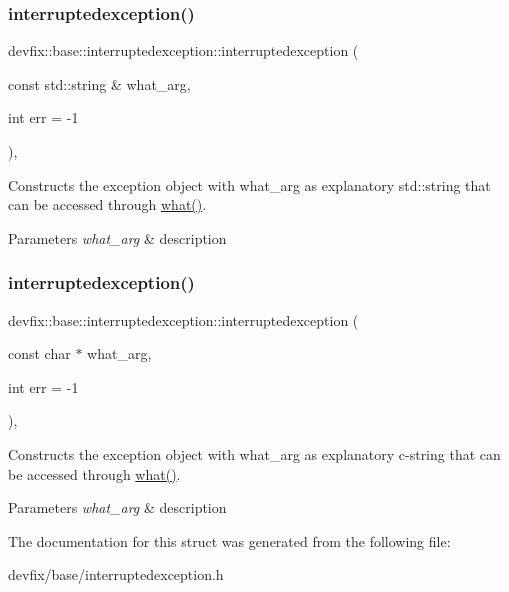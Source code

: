 \subsubsection{\texorpdfstring{interruptedexception()}{interruptedexception()}\hspace{0.1cm}{\footnotesize\ttfamily [1/2]}}
{\footnotesize\ttfamily devfix\+::base\+::interruptedexception\+::interruptedexception (\begin{DoxyParamCaption}\item[{const std\+::string \&}]{what\+\_\+arg,  }\item[{int}]{err = {\ttfamily -\/1} }\end{DoxyParamCaption})\hspace{0.3cm}{\ttfamily [inline]}, {\ttfamily [explicit]}}

Constructs the exception object with what\+\_\+arg as explanatory std\+::string that can be accessed through \hyperlink{structdevfix_1_1base_1_1exception_ad2066a6a81737c0fdf776120a6ca69d2}{what()}. 
\begin{DoxyParams}{Parameters}
{\em what\+\_\+arg} & description \\
\hline
\end{DoxyParams}
\mbox{\label{structdevfix_1_1base_1_1interruptedexception_a3115c6a0ad2a463d04629df99ec4d119}} 
\subsubsection{\texorpdfstring{interruptedexception()}{interruptedexception()}\hspace{0.1cm}{\footnotesize\ttfamily [2/2]}}
{\footnotesize\ttfamily devfix\+::base\+::interruptedexception\+::interruptedexception (\begin{DoxyParamCaption}\item[{const char $\ast$}]{what\+\_\+arg,  }\item[{int}]{err = {\ttfamily -\/1} }\end{DoxyParamCaption})\hspace{0.3cm}{\ttfamily [inline]}, {\ttfamily [explicit]}}

Constructs the exception object with what\+\_\+arg as explanatory c-\/string that can be accessed through \hyperlink{structdevfix_1_1base_1_1exception_ad2066a6a81737c0fdf776120a6ca69d2}{what()}. 
\begin{DoxyParams}{Parameters}
{\em what\+\_\+arg} & description \\
\hline
\end{DoxyParams}


The documentation for this struct was generated from the following file\+:\begin{DoxyCompactItemize}
\item 
devfix/base/interruptedexception.\+h\end{DoxyCompactItemize}
